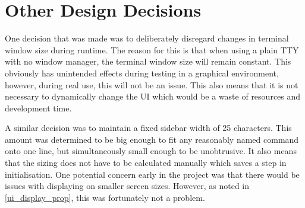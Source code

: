 \section{Other Design Decisions}
\label{other_decisions}

One decision that was made was to deliberately disregard changes in terminal window size during runtime. The reason for this is that when using a plain {\selectfont TTY} with no window manager, the terminal window size will remain constant. This obviously has unintended effects during testing in a graphical environment, however, during real use, this will not be an issue. This also means that it is not necessary to dynamically change the UI which would be a waste of resources and development time.

A similar decision was to maintain a fixed sidebar width of 25 characters. This amount was determined to be big enough to fit any reasonably named command onto one line, but simultaneously small enough to be unobtrusive. It also means that the sizing does not have to be calculated manually which saves a step in initialisation. One potential concern early in the project was that there would be issues with displaying on smaller screen sizes. However, as noted in \ref{ui_display_prop}, this was fortunately not a problem.
